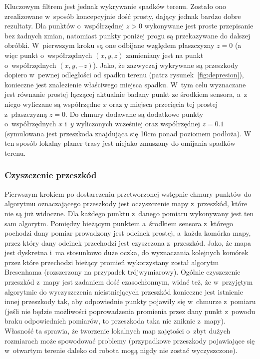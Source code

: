 Kluczowym filtrem jest jednak wykrywanie spadków terenu. Zostało ono zrealizowane
w~sposób koncepcyjnie dość prosty, dający jednak bardzo dobre rezultaty. Dla punktów
o~współrzędnej $z>0$ wykonywane
jest proste przepisanie bez żadnych zmian, natomiast punkty poniżej progu są przekazywane
do dalszej obróbki. W~pierwszym kroku są one odbijane względem płaszczyzny $z=0$
(a więc punkt o~współrzędnych $(x, y, z)$ zamieniany jest na punkt o~współrzędnych
$(x, y, -z)$). Jako, że zazwyczaj wykrywane są przeszkody dopiero w~pewnej
odległości od spadku terenu (patrz rysunek~\ref{fig:depresion}), konieczne jest
znalezienie właściwego miejsca spadku. W~tym celu wyznaczane jest równanie prostej
łączącej aktualnie badany punkt ze środkiem sensora, a~z niego wyliczane są współrzędne
$x$ oraz $y$ miejsca przecięcia tej prostej z~płaszczyzną $z=0$. Do chmury dodawane
są dodatkowe punkty o~współrzędnych $x$ i~$y$ wyliczonych wcześniej oraz współrzędnej
$z=0.1$ (symulowana jest przeszkoda znajdująca się 10cm ponad poziomem podłoża).
W ten sposób lokalny planer trasy jest niejako zmuszany do omijania spadków terenu.

\subsubsection{Czyszczenie przeszkód}

Pierwszym krokiem po dostarczeniu przetworzonej wstępnie chmury punktów do algorytmu
oznaczającego przeszkody jest oczyszczenie mapy z~przeszkód, które nie są już widoczne.
Dla każdego punktu z~danego pomiaru wykonywany jest ten sam algorytm. Pomiędzy
bieżącym punktem a~środkiem sensora z~którego pochodzi dany pomiar prowadzony jest
odcinek prostej, a~każda komórka mapy, przez który dany odcinek przechodzi jest
czyszczona z~przeszkód. Jako, że mapa jest dyskretna i~ma stosunkowo duże oczka,
do wyznaczania kolejnych komórek przez które przechodzi bieżący promień wykorzystany
został algorytm Bresenhama (rozszerzony na przypadek trójwymiarowy). Ogólnie czyszczenie
przeszkód z~mapy jest zadaniem dość czasochłonnym, widać też, że w~przyjętym algorytmie
do wyczyszczenia nieistniejących przeszkód konieczne jest istnienie innej przeszkody
tak, aby odpowiednie punkty pojawiły się w~chmurze z~pomiaru (jeśli nie będzie możliwości
poprowadzenia promienia przez dany punkt z~powodu braku odpowiednich pomiarów, to
przeszkoda taka nie zniknie z~mapy). Własność ta sprawia, że tworzenie lokalnych
map zajętości o~zbyt dużych rozmiarach może spowodować problemy (przypadkowe przeszkody
pojawiające się w~otwartym terenie daleko od robota mogą nigdy nie zostać wyczyszczone).

